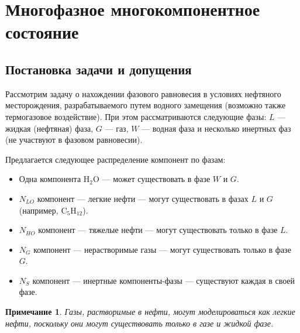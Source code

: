 \documentclass[12pt]{article}
\newtheorem{note}{Примечание}[section]
\begin{document}
\section{Многофазное многокомпонентное состояние}

\subsection{Постановка задачи и допущения}

Рассмотрим задачу о нахождении фазового равновесия в условиях нефтяного месторождения, разрабатываемого путем водного замещения (возможно также термогазовое воздействие). При этом рассматриваются следующие фазы: $L$ --- жидкая (нефтяная) фаза, $G$ --- газ, $W$ --- водная фаза и несколько инертных фаз (не  участвуют в фазовом равновесии).

Предлагается следующее распределение компонент по фазам:
\begin{itemize}
\item Одна компонента $\mathrm{H_2O}$ --- может существовать в фазе $W$ и $G$.
\item $N_{LO}$ компонент --- легкие нефти --- могут существовать в фазах $L$ и $G$ (например, $\mathrm{C_5H_{12}}$).
\item $N_{HO}$ компонент --- тяжелые нефти --- могут существовать только в фазе $L$.
\item $N_{G}$ компонент --- нерастворимые газы --- могут существовать только в фазе $G$.
\item $N_{S}$ компонент --- инертные компоненты-фазы --- существуют каждая в своей фазе.
\end{itemize}

\begin{note}
Газы, растворимые в нефти, могут моделироваться как легкие нефти, поскольку они могут существовать только в газе и жидкой фазе.
\end{note}
\end{document}
